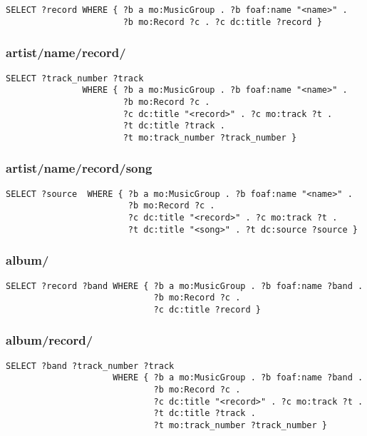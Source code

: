 \documentclass[a4paper,oneside]{report}
\begin{document}
\begin{lstlisting}
SELECT ?record WHERE { ?b a mo:MusicGroup . ?b foaf:name "<name>" .
                       ?b mo:Record ?c . ?c dc:title ?record }
\end{lstlisting}

\subsubsection{artist/name/record/}

\begin{lstlisting}
SELECT ?track_number ?track 
               WHERE { ?b a mo:MusicGroup . ?b foaf:name "<name>" . 
                       ?b mo:Record ?c .
                       ?c dc:title "<record>" . ?c mo:track ?t .
                       ?t dc:title ?track . 
                       ?t mo:track_number ?track_number }
\end{lstlisting}

\subsubsection{artist/name/record/song}

\begin{lstlisting}
SELECT ?source  WHERE { ?b a mo:MusicGroup . ?b foaf:name "<name>" . 
                        ?b mo:Record ?c .
                        ?c dc:title "<record>" . ?c mo:track ?t .
                        ?t dc:title "<song>" . ?t dc:source ?source }
\end{lstlisting}

\subsubsection{album/}

\begin{lstlisting}
SELECT ?record ?band WHERE { ?b a mo:MusicGroup . ?b foaf:name ?band . 
                             ?b mo:Record ?c .
                             ?c dc:title ?record }
\end{lstlisting}

\subsubsection{album/record/}

\begin{lstlisting}
SELECT ?band ?track_number ?track 
                     WHERE { ?b a mo:MusicGroup . ?b foaf:name ?band . 
                             ?b mo:Record ?c .
                             ?c dc:title "<record>" . ?c mo:track ?t .
                             ?t dc:title ?track . 
                             ?t mo:track_number ?track_number }
\end{lstlisting}
\end{document}
